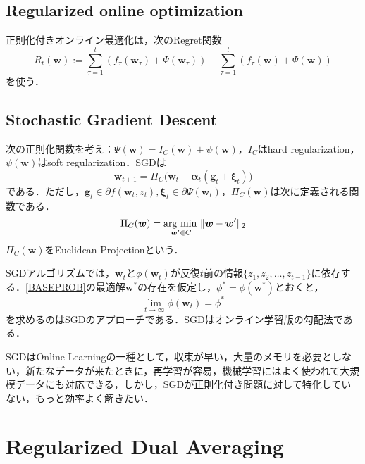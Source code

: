 \documentclass[a4paper,11pt]{jsarticle}
\numberwithin{theorem}{section}  %
\numberwithin{equation}{section} %
\newcommand{\argmin}{\mathop{\rm arg~min\,}\limits}
\begin{document}
\subsection{Regularized online optimization}
正則化付きオンライン最適化は，次のRegret関数
\begin{equation}
R_t(\bm{w}) := \sum_{\tau=1}^t (f_{\tau}(\bm{w}_{\tau}) + \Psi(\bm{w}_{\tau})) - \sum_{\tau=1}^t (f_{\tau}(\bm{w}) + \Psi(\bm{w})) 
\label{REGRET}
\end{equation}
を使う．

\subsection{Stochastic Gradient Descent}

次の正則化関数を考え：$\Psi(\bm{w}) = I_{C}(\bm{w}) + \psi(\bm{w})$，$I_{C}$はhard regularization，$\psi(\bm{w})$はsoft regularization．SGDは
\begin{equation}
\bm{w}_{t+1} = \Pi_{C}\bigr( \bm{w}_t - \bm{\alpha}_t(\bm{g}_t + \bm{\xi}_t) \bigr)
\end{equation}
である．ただし，$\bm{g}_t \in \partial f(\bm{w}_t,z_t), \bm{\xi}_t \in \partial \Psi(\bm{w}_t)$，$\Pi_C(\bm{w})$は次に定義される関数である．
\begin{equation}
\Pi_C(\bm{w}) = \argmin_{\bm{w}' \in C} \| \bm{w} - \bm{w}' \|_2
\end{equation}
$\Pi_C(\bm{w}) $をEuclidean Projectionという．

SGDアルゴリズムでは，$\bm{w}_t$と$\phi(\bm{w}_t)$が反復$t$前の情報$\{z_1,z_2,\dots,z_{t-1}\}$に依存する．\eqref{BASEPROB}の最適解$\bm{w}^*$の存在を仮定し，$\phi^* = \phi(\bm{w}^*)$とおくと，
\[
\lim_{t\to \infty} \phi(\bm{w}_t) = \phi^*
\]
を求めるのはSGDのアプローチである．SGDはオンライン学習版の勾配法である．

SGDはOnline Learningの一種として，収束が早い，大量のメモリを必要としない，新たなデータが来たときに，再学習が容易，機械学習にはよく使われて大規模データにも対応できる，しかし，SGDが正則化付き問題に対して特化していない，もっと効率よく解きたい．

\section{Regularized Dual Averaging}
\end{document}
